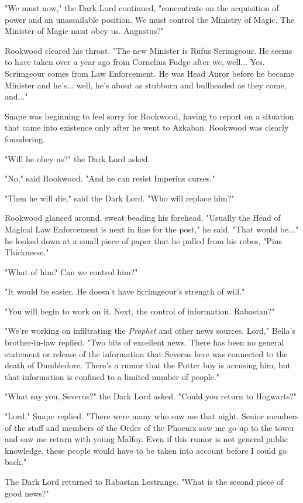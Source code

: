 \documentclass[a4paper,11pt]{article}
\begin{document}
"We must now," the Dark Lord continued, "concentrate on the acquisition of power and an unassailable position. We must control the Ministry of Magic. The Minister of Magic must obey us. Augustus?"

Rookwood cleared his throat. "The new Minister is Rufus Scrimgeour. He seems to have taken over a year ago from Cornelius Fudge after we, well... Yes. Scrimgeour comes from Law Enforcement. He was Head Auror before he became Minister and he's... well, he's about as stubborn and bullheaded as they come, and..."

Snape was beginning to feel sorry for Rookwood, having to report on a situation that came into existence only after he went to Azkaban. Rookwood was clearly foundering.

"Will he obey us?" the Dark Lord asked.

"No," said Rookwood. "And he can resist Imperius curses."

"Then he will die," said the Dark Lord. "Who will replace him?"

Rookwood glanced around, sweat beading his forehead. "Usually the Head of Magical Law Enforcement is next in line for the post," he said. "That would be..." he looked down at a small piece of paper that he pulled from his robes, "Pius Thicknesse."

"What of him? Can we control him?"

"It would be easier. He doesn't have Scrimgeour's strength of will."

"You will begin to work on it. Next, the control of information. Rabastan?"

"We're working on infiltrating the \emph{Prophet} and other news sources, Lord," Bella's brother-in-law replied. "Two bits of excellent news. There has been no general statement or release of the information that Severus here was connected to the death of Dumbledore. There's a rumor that the Potter boy is accusing him, but that information is confined to a limited number of people."

"What say you, Severus?" the Dark Lord asked. "Could you return to Hogwarts?"

"Lord," Snape replied. "There were many who saw me that night. Senior members of the staff and members of the Order of the Phoenix saw me go up to the tower and saw me return with young Malfoy. Even if this rumor is not general public knowledge, these people would have to be taken into account before I could go back."

The Dark Lord returned to Rabastan Lestrange. "What is the second piece of good news?"
\end{document}
